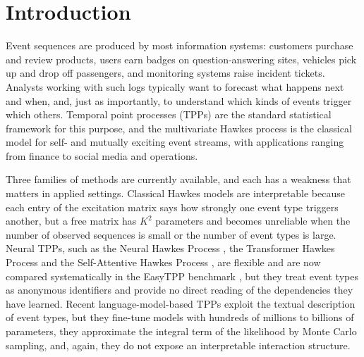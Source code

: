 \documentclass[preprint,12pt,authoryear]{elsarticle}
\newcommand{\todo}[1]{{\color{red}[#1]}}
\begin{document}

\section{Introduction}
\label{sec:intro}

Event sequences are produced by most information systems: customers purchase and review products, users earn badges on question-answering sites, vehicles pick up and drop off passengers, and monitoring systems raise incident tickets. Analysts working with such logs typically want to forecast what happens next and when, and, just as importantly, to understand which kinds of events trigger which others. Temporal point processes (TPPs) are the standard statistical framework for this purpose, and the multivariate Hawkes process \citep{hawkes1971spectra} is the classical model for self- and mutually exciting event streams, with applications ranging from finance \citep{bacry2015hawkes} to social media and operations.

Three families of methods are currently available, and each has a weakness that matters in applied settings. Classical Hawkes models are interpretable because each entry of the excitation matrix says how strongly one event type triggers another, but a free matrix has $K^2$ parameters and becomes unreliable when the number of observed sequences is small or the number of event types is large. Neural TPPs, such as the Neural Hawkes Process \citep{mei2017neural}, the Transformer Hawkes Process \citep{zuo2020transformer} and the Self-Attentive Hawkes Process \citep{zhang2020self}, are flexible and are now compared systematically in the EasyTPP benchmark \citep{xue2024easytpp}, but they treat event types as anonymous identifiers and provide no direct reading of the dependencies they have learned. Recent language-model-based TPPs \citep{liu2024tppllm,kong2025bytetoken,chen2025tal} exploit the textual description of event types, but they fine-tune models with hundreds of millions to billions of parameters, they approximate the integral term of the likelihood by Monte Carlo sampling, and, again, they do not expose an interpretable interaction structure.
\end{document}
